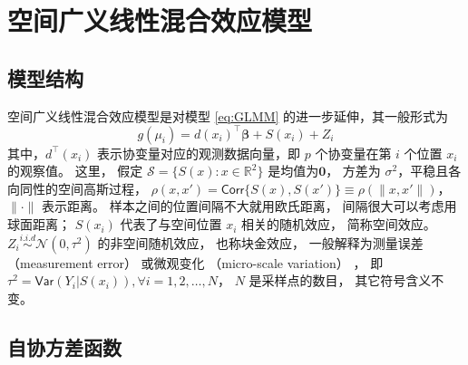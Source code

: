 \documentclass[12pt,a4paper,UTF8,twoside]{book}
\theoremstyle{definition}
\theoremstyle{definition}
\theoremstyle{definition}
\theoremstyle{remark}
\begin{document}
\hypertarget{sec:Spatial-Generalized-linear-mixed-effects-models}{%
\section{空间广义线性混合效应模型}\label{sec:Spatial-Generalized-linear-mixed-effects-models}}

\hypertarget{subsec:structure-sglmm}{%
\subsection{模型结构}\label{subsec:structure-sglmm}}

空间广义线性混合效应模型是对模型 \eqref{eq:GLMM}
的进一步延伸，其一般形式为 \begin{equation}
g(\mu_i) = d(x_i)^{\top}\boldsymbol{\beta} + S(x_i) + Z_i \label{eq:SGLMM}
\end{equation} \noindent 其中，\(d^{\top}(x_i)\)
表示协变量对应的观测数据向量，即 \(p\) 个协变量在第 \(i\) 个位置 \(x_i\)
的观察值。 这里， 假定 \(\mathcal{S} = \{S(x): x \in \mathbb{R}^2\}\)
是均值为\(\mathbf{0}\)， 方差为
\(\sigma^2\)，平稳且各向同性的空间高斯过程，
\(\rho(x,x') = \mathsf{Corr}\{S(x),S(x')\} \equiv \rho(\|x,x'\|)\)，
\(\|\cdot\|\) 表示距离。 样本之间的位置间隔不大就用欧氏距离，
间隔很大可以考虑用球面距离； \(S(x_i)\) 代表了与空间位置 \(x_i\)
相关的随机效应， 简称空间效应。
\(Z_i \stackrel{i.i.d}{\sim} \mathcal{N}(0,\tau^2)\) 的非空间随机效应，
也称块金效应， 一般解释为测量误差 （measurement error） 或微观变化
（micro-scale variation） \citep{Christensen2004}， 即
\(\tau^2=\mathsf{Var}(Y_{i}|S(x_{i})),\forall i = 1,2, \ldots, N\)，
\(N\) 是采样点的数目， 其它符号含义不变。

\hypertarget{subsec:covariance-function}{%
\subsection{自协方差函数}\label{subsec:covariance-function}}
\end{document}
